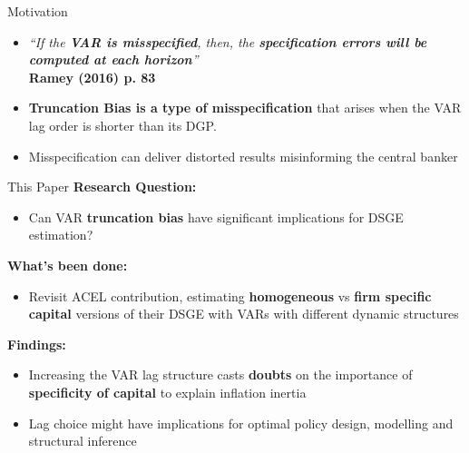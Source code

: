 \documentclass[11pt]{beamer}
\begin{document}

\begin{frame}{Motivation}
    \begin{itemize}
        \item \textit{``If the \textbf{VAR is misspecified}, then, the \textbf{specification errors will be computed at each horizon}''}
        \vspace{0.1cm}
        \\
        \hfill {\small \textbf{Ramey (2016) p. 83} }
        \vspace{0.3cm}
        \pause
        
        \item \textcolor{PadovaRed}{\textbf{Truncation Bias is a type of misspecification}} that arises when the VAR lag order is shorter than its DGP. 
        \vspace{0.3cm}
        \pause

        \item Misspecification can deliver distorted results misinforming the central banker %
    \end{itemize}

\end{frame}


\begin{frame}{This Paper}\label{slide:this_paper}
    \textbf{Research Question:}
    \begin{itemize}
        \item {\textcolor{PadovaRed}{Can VAR \textbf{truncation bias} have significant implications for DSGE estimation?}}
    \end{itemize}
    
    \vspace{0.4cm}
    \textbf{What's been done:}
    \begin{itemize}
        \item Revisit ACEL contribution, estimating \textcolor{PadovaRed}{\textbf{homogeneous}} vs \textcolor{PadovaRed}{\textbf{firm specific capital}} versions of their DSGE with VARs with different dynamic structures
    \end{itemize}
    \pause
    
    \vspace{0.4cm}    
    \textbf{Findings:}
    \begin{itemize}
        \item Increasing the VAR lag structure casts \textcolor{PadovaRed}{\textbf{doubts}} on the importance of \textcolor{PadovaRed}{\textbf{specificity of capital}} to explain inflation inertia
        \item Lag choice might have implications for optimal policy design, modelling and structural inference
    \end{itemize}
\end{frame}
\end{document}
